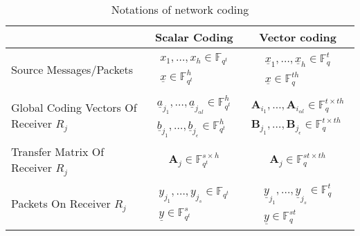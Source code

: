 \begin{table}[h]
\caption{Notations of network coding}

\label{tab:notations} 

\begin{tabular}{|>{\centering}p{0.2\paperwidth}|c|c|}
\hline 
 & Scalar Coding & Vector coding\tabularnewline
\hline 
\hline 
Source Messages/Packets & $\begin{array}{c}
x_{1},\ldots,x_{h}\in\ensuremath{\mathbb{F}}_{q^{t}}\\
\underline{x}\in\ensuremath{\mathbb{F}}_{q^{t}}^{h}
\end{array}$ & $\begin{array}{c}
\underline{x}_{1},\ldots,\underline{x}_{h}\in\ensuremath{\mathbb{F}}_{q}^{t}\\
\underline{x}\in\ensuremath{\mathbb{F}}_{q}^{th}
\end{array}$\tabularnewline
\hline 
Global Coding Vectors Of Receiver $R_{j}$ & $\begin{array}{c}
\underline{a}_{j_{1}},\ldots,\underline{a}_{j_{\alpha l}}\in\ensuremath{\mathbb{F}}_{q^{t}}^{h}\\
\underline{b}_{j_{1}},\ldots,\underline{b}_{j_{\epsilon}}\in\ensuremath{\mathbb{F}}_{q^{t}}^{h}
\end{array}$ & $\begin{array}{c}
\boldsymbol{A}_{i_{1}},\ldots,\boldsymbol{A}_{i_{\alpha l}}\in\ensuremath{\mathbb{F}}_{q}^{t\times th}\\
\boldsymbol{B}_{j_{1}},\ldots,\boldsymbol{B}_{j_{\epsilon}}\in\ensuremath{\mathbb{F}}_{q}^{t\times th}
\end{array}$\tabularnewline
\hline 
Transfer Matrix Of Receiver $R_{j}$ & $\boldsymbol{A}_{j}\in\ensuremath{\mathbb{F}}_{q^{t}}^{s\times h}$ & $\boldsymbol{A}_{j}\in\ensuremath{\mathbb{F}}_{q}^{st\times th}$\tabularnewline
\hline 
Packets On Receiver $R_{j}$ & $\begin{array}{c}
y_{j_{1}},\ldots,y_{j_{s}}\in\ensuremath{\mathbb{F}}_{q^{t}}\\
\underline{y}\in\ensuremath{\mathbb{F}}_{q^{t}}^{s}
\end{array}$ & $\begin{array}{c}
\underline{y}_{j_{1}},\ldots,\underline{y}_{j_{s}}\in\ensuremath{\mathbb{F}}_{q}^{t}\\
\underline{y}\in\ensuremath{\mathbb{F}}_{q}^{st}
\end{array}$\tabularnewline
\hline 
\end{tabular}
\end{table}

